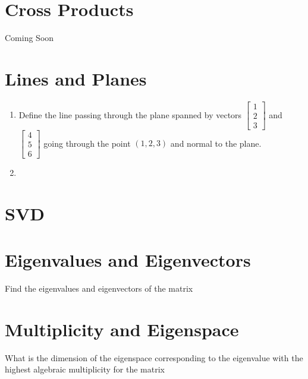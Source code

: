 \documentclass{ximera}
\begin{document}
\section*{Cross Products}

Coming Soon

\section*{Lines and Planes}

\begin{example}

    \begin{enumerate}
        \item Define the line passing through the plane spanned by vectors $\begin{bmatrix} 1 \\ 2 \\ 3 \end{bmatrix}$ and $\begin{bmatrix} 4 \\ 5 \\ 6 \end{bmatrix}$ going through the point $(1,2,3)$ and normal to the plane.
        \item %
        
    \end{enumerate}
\end{example}


\section*{SVD}


\section*{Eigenvalues and Eigenvectors}

\begin{example}
    Find the eigenvalues and eigenvectors of the matrix 

    
\end{example}

\section*{Multiplicity and Eigenspace}

\begin{example}
    What is the dimension of the eigenspace corresponding to the eigenvalue with the highest algebraic multiplicity for the matrix 



\end{example}
\end{document}
